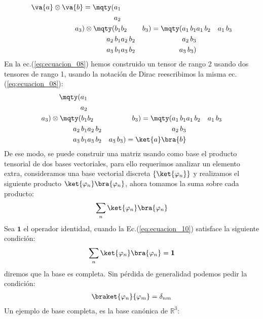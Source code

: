 \begin{align}
\va{a} \otimes \va{b} = 
\mqty(a_{1} \\ a_{2} \\ a_{3}) \otimes \mqty(b_{1} & b_{2} & b_{3}) = \mqty(
a_{1} \, b_{1} & a_{1} \, b_{2} & a_{1} \, b_{3} \\
a_{2} \, b_{1} & a_{2} \, b_{2} & a_{2} \, b_{3} \\
a_{3} \, b_{1} & a_{3} \, b_{2} & a_{3} \, b_{3}
)
\label{eq:ecuacion_08}
\end{align}
En la ec.(\ref{eq:ecuacion_08}) hemos construido un tensor de rango 2 usando dos tensores de rango 1, usando la notación de Dirac reescribimos la misma ec.(\ref{eq:ecuacion_08}):
\begin{align}
\mqty(a_{1} \\ a_{2} \\ a_{3}) \otimes \mqty(b_{1} & b_{2} & b_{3}) = \mqty(
a_{1} \, b_{1} & a_{1} \, b_{2} & a_{1} \, b_{3} \\
a_{2} \, b_{1} & a_{2} \, b_{2} & a_{2} \, b_{3} \\
a_{3} \, b_{1} & a_{3} \, b_{2} & a_{3} \, b_{3}
) = \ket{a} \bra{b}
\label{eq:ecuacion_09}
\end{align}
De ese modo, se puede construir una matriz usando como base el producto tensorial de dos bases vectoriales, para ello requerimos analizar un elemento extra, consideramos una base vectorial discreta $\left\{ \ket{\varphi_{n}} \right\} $ y realizamos el siguiente producto $\ket{\varphi_{n}} \bra{\varphi_{n}}$, ahora tomamos la suma sobre cada producto:
\begin{align}
\sum_{n} \ket{\varphi_{n}} \bra{\varphi_{n}}
\label{eq:ecuacion_10}
\end{align}
Sea $\mathbf{1}$ el operador identidad, cuando la Ec.(\ref{eq:ecuacion_10}) satisface la siguiente condición:
\begin{align}
\sum_{n} \ket{\varphi_{n}} \bra{\varphi_{n}} = \mathbf{1}
\label{eq:ecuacion_11}
\end{align}
diremos que la base es completa. Sin pérdida de generalidad podemos pedir la condición:
\begin{align*}
\braket{\varphi_{n}}{\varphi_{m}} = \delta_{nm}
\end{align*}
Un ejemplo de base completa, es la base canónica de $\mathbb{R}^{3}$:

